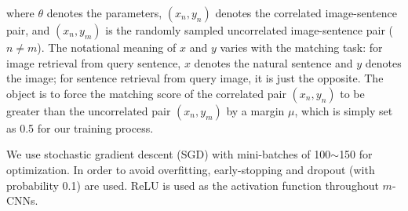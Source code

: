 \documentclass[10pt,twocolumn,letterpaper]{article}
\begin{document}
where $\theta$ denotes the parameters, $(x_n,y_n)$ denotes the correlated image-sentence pair, and $(x_n,y_m)$ is the randomly sampled uncorrelated image-sentence pair ($n\neq m$). The notational meaning of $x$ and $y$ varies with the matching task: for image retrieval from query sentence, $x$ denotes the natural sentence and $y$ denotes the image; for sentence retrieval from query image, it is just the opposite. The object is to force the matching score of the correlated pair $(x_n,y_n)$ to be greater than the uncorrelated pair $(x_n,y_m)$ by a margin $\mu$, which is simply set as 0.5 for our training process.




We use stochastic gradient descent (SGD) with mini-batches of 100$\sim$150 for optimization.
In order to avoid overfitting, early-stopping \cite{caruana_nips2000} and dropout (with probability 0.1) \cite{hinton_corr2012} are used. ReLU is used as the activation function throughout $m$-CNNs.
\end{document}
